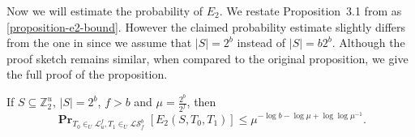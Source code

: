 \documentclass[unicode,review]{siamart1116}
\newcommand{\vecspace}[2]{\mathbb{Z}_{#1}^{#2}}
\newcommand{\binvecspace}[1]{\vecspace{2}{#1}}
\newcommand{\linearmaps}[2]{\mathcal{L}_{#1}^{#2}}
\newcommand{\surjectivelinearmaps}[2]{\mathcal{LS}_{#1}^{#2}}
\newcommand{\probs}[2]{\operatorname{\mathbf{Pr}}_{{#1}}\left[{#2}\right]}
\numberwithin{theorem}{section}
\begin{document}
Now we will estimate the probability of $E_2$.
We restate Proposition~3.1 from \cite{alonetal} as \cref{proposition-e2-bound}.
However the claimed probability estimate slightly differs from the one in \cite{alonetal} since we assume that $|S| = 2^b$ instead of $|S| = b2^b$.
Although the proof sketch remains similar, when compared to the original proposition, we give the full proof of the proposition.

\begin{proposition}
\label{proposition-e2-bound}
If $S \subseteq \binvecspace{u}$, $|S| = 2^b$, $f > b$ and $\mu = \frac{2^b}{2^f}$, then
\[
\probs{T_0 \in_U \linearmaps{u}{f}, T_1 \in_U \surjectivelinearmaps{f}{b}}{E_2(S, T_0, T_1)} \leq \mu ^ {-\log b - \log \mu + \log \log \mu^{-1}}.
\]
\end{proposition}
\end{document}
